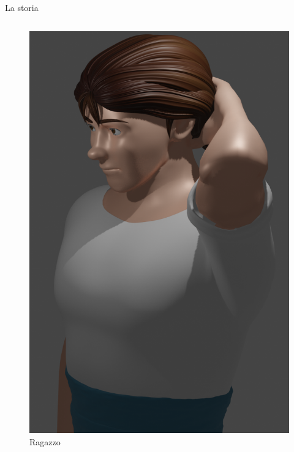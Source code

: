 \documentclass[10pt]{beamer}
\begin{document}
\begin{frame}[fragile]{La storia}
\begin{columns}[T,onlytextwidth]
      \begin{figure}
          \centering
          \includegraphics[width=\textwidth]{figures/ragazzo.png}
          \caption{Ragazzo}
      \end{figure}


\end{columns}
\end{frame}
\end{document}
